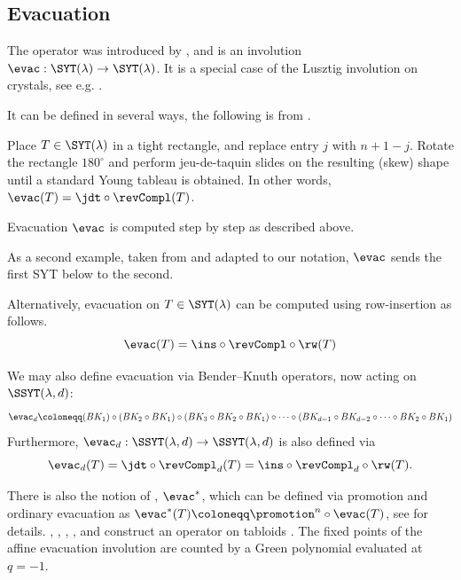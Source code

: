 \subsection[evacuation]{Evacuation}

The \label{tableauEvacuation} operator was introduced by
 \cite{Schutzenberger1963},
and is an involution $\evac : \SYT(\lambda) \to \SYT(\lambda)$.
It is a special case of the Lusztig involution on crystals, see e.g.
\cite{MonicalPechenikScrimshaw2018}.

It can be defined in several ways, the following is from \cite{Butler1994}.

Place $T \in \SYT(\lambda)$ in a tight rectangle, and replace entry $j$ with $n+1-j$.
Rotate the rectangle $180^\circ$ and perform jeu-de-taquin slides on the resulting (skew)
shape until a standard Young tableau is obtained.
In other words, $\evac(T) = \jdt \circ \revCompl(T)$.

\begin{example*}[Evacuation]
Evacuation $\evac$ is computed step by step as described above.
\begin{figure}
\end{figure}

As a second example, taken from \cite{PonWang2011} and adapted to our
notation, $\evac$ sends the
first SYT below to the second.
\begin{figure}
\end{figure}
\end{example*}

Alternatively, evacuation on $T \in \SYT(\lambda)$ can be computed using row-insertion as follows.
\[
\evac(T) = \ins \circ \revCompl \circ \rw(T)
\]

We may also define evacuation via Bender--Knuth operators, now acting on $\SSYT(\lambda,d)$:
\[
\evac_d \coloneqq (BK_1) \circ (BK_2 \circ BK_1) \circ (BK_3 \circ BK_2 \circ BK_1)
\circ \dotsb \circ (BK_{d-1} \circ BK_{d-2} \circ \dotsb \circ BK_2 \circ BK_1)
\]
Furthermore, $\evac_d : \SSYT(\lambda,d) \to \SSYT(\lambda,d)$ is also defined via
\[
\evac_d(T) = \jdt \circ \revCompl_d(T) = \ins \circ \revCompl_d \circ \rw(T).
\]


There is also the notion of
\label{dualEvacuation}, $\evac^*$,
which can be defined via promotion and ordinary evacuation as
$\evac^*(T) \coloneqq \promotion^n \circ \evac(T)$, see \cite{Stanley2009} for details.
, , ,
, and 
construct an \label{affineEvacuation} operator on tabloids
\cite{ChmutovFriedenKimLewisYudovina2022}.  The fixed points of the affine
evacuation involution are counted by a Green polynomial evaluated at $q=-1$.

